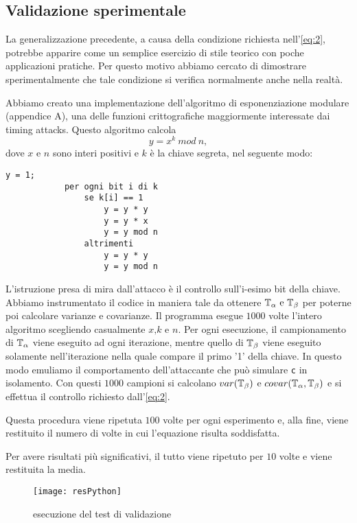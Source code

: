 	\subsection{Validazione sperimentale}
		La generalizzazione precedente, a causa della condizione richiesta nell'\cref{eq:2}, potrebbe apparire come un semplice esercizio di stile teorico con poche applicazioni pratiche. Per questo motivo abbiamo cercato di dimostrare sperimentalmente che tale condizione si verifica normalmente anche nella realtà.
		
		Abbiamo creato una implementazione dell'algoritmo di esponenziazione modulare (appendice A), una delle funzioni crittografiche maggiormente interessate dai timing attacks. Questo algoritmo calcola $$y = x^k \ mod \ n,$$ dove $x$ e $n$ sono interi positivi e $k$ è la chiave segreta, nel seguente modo: 
		
		\begin{center}
			\begin{lstlisting}[caption={algoritmo di esponenziazione modulare},label={list:espMod}]
			y = 1;
			per ogni bit i di k
				se k[i] == 1
					y = y * y
					y = y * x
					y = y mod n
				altrimenti
					y = y * y
					y = y mod n
			\end{lstlisting}
		\end{center}
	
		L'istruzione presa di mira dall'attacco è il controllo sull'i-esimo bit della chiave. Abbiamo instrumentato il codice in maniera tale da ottenere $\mathbb{T}_{\alpha} \text{ e } \mathbb{T}_{\beta}$ per poterne poi calcolare varianze e covarianze. Il programma esegue $1000$ volte l'intero algoritmo scegliendo casualmente $x\text{,}k\text{ e }n$. Per ogni esecuzione, il campionamento di $\mathbb{T}_{\alpha}$ viene eseguito ad ogni iterazione, mentre quello di $\mathbb{T}_{\beta}$ viene eseguito solamente nell'iterazione nella quale compare il primo '1' della chiave. In questo modo emuliamo il comportamento dell'attaccante che può simulare \texttt{c} in isolamento. Con questi $1000$ campioni si calcolano $var(\mathbb{T}_{\beta})$ e $covar(\mathbb{T}_{\alpha},\mathbb{T}_{\beta})$ e si effettua il controllo richiesto dall'\cref{eq:2}.
		
		Questa procedura viene ripetuta $100$ volte per ogni esperimento e, alla fine, viene restituito il numero di volte in cui l'equazione risulta soddisfatta.
		
		Per avere risultati più significativi, il tutto viene ripetuto per $10$ volte e viene restituita la media.
		
		\begin{figure}
			\begin{center}
				\texttt{[image: resPython]}
				\caption{esecuzione del test di validazione}
				\label{fig:resPython}
			\end{center}
		\end{figure}
	
